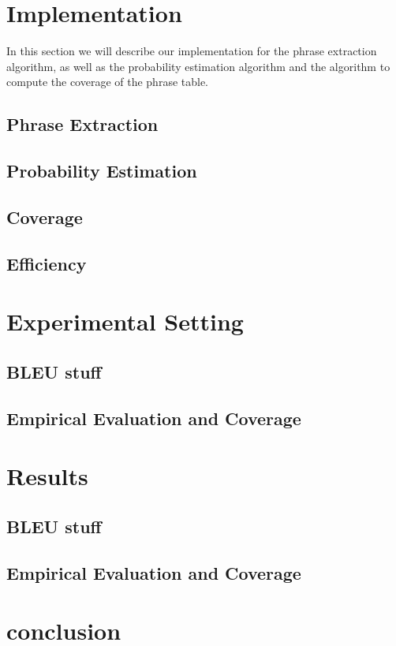 \documentclass[11pt]{article}
\begin{document}
\section{Implementation}
\label{implem}
In this section we will describe our implementation for the phrase extraction algorithm, as well as the probability estimation algorithm and the algorithm to compute the coverage of the phrase table. 
\subsection{Phrase Extraction}
\label{implem1}

\subsection{Probability Estimation}
\label{implem2}

\subsection{Coverage}
\label{implem2}


\subsection{Efficiency}

\section{Experimental Setting}

\subsection{BLEU stuff}

\subsection{Empirical Evaluation and Coverage}
\label{eval}

\section{Results}

\subsection{BLEU stuff}

\subsection{Empirical Evaluation and Coverage}

\section{conclusion}

\end{document}
